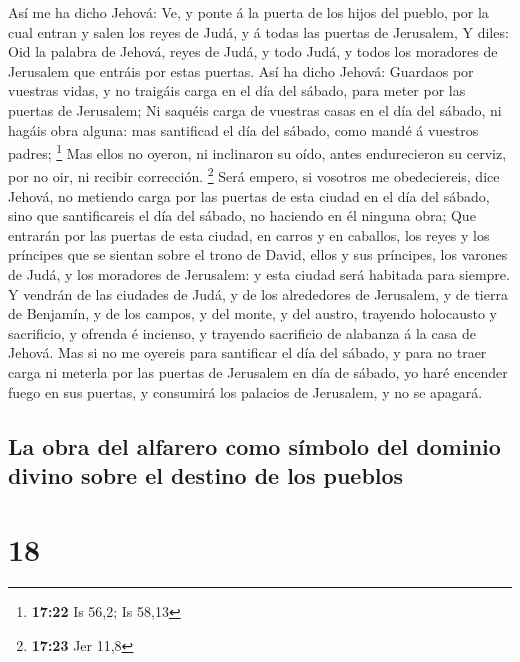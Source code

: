  Así me ha dicho Jehová: Ve, y ponte á la puerta de los
hijos del pueblo, por la cual entran y salen los reyes de Judá, y á
todas las puertas de Jerusalem,  Y diles: Oid la palabra de
Jehová, reyes de Judá, y todo Judá, y todos los moradores de Jerusalem
que entráis por estas puertas.  Así ha dicho Jehová:
Guardaos por vuestras vidas, y no traigáis carga en el día del sábado,
para meter por las puertas de Jerusalem;  Ni saquéis carga
de vuestras casas en el día del sábado, ni hagáis obra alguna: mas
santificad el día del sábado, como mandé á vuestros padres; \footnote{\textbf{17:22}
  Is 56,2; Is 58,13}  Mas ellos no oyeron, ni inclinaron su
oído, antes endurecieron su cerviz, por no oir, ni recibir corrección.
\footnote{\textbf{17:23} Jer 11,8}  Será empero, si
vosotros me obedeciereis, dice Jehová, no metiendo carga por las puertas
de esta ciudad en el día del sábado, sino que santificareis el día del
sábado, no haciendo en él ninguna obra;  Que entrarán por
las puertas de esta ciudad, en carros y en caballos, los reyes y los
príncipes que se sientan sobre el trono de David, ellos y sus príncipes,
los varones de Judá, y los moradores de Jerusalem: y esta ciudad será
habitada para siempre.  Y vendrán de las ciudades de Judá,
y de los alrededores de Jerusalem, y de tierra de Benjamín, y de los
campos, y del monte, y del austro, trayendo holocausto y sacrificio, y
ofrenda é incienso, y trayendo sacrificio de alabanza á la casa de
Jehová.  Mas si no me oyereis para santificar el día del
sábado, y para no traer carga ni meterla por las puertas de Jerusalem en
día de sábado, yo haré encender fuego en sus puertas, y consumirá los
palacios de Jerusalem, y no se apagará.

\hypertarget{la-obra-del-alfarero-como-suxedmbolo-del-dominio-divino-sobre-el-destino-de-los-pueblos}{%
\subsection{La obra del alfarero como símbolo del dominio divino sobre
el destino de los
pueblos}\label{la-obra-del-alfarero-como-suxedmbolo-del-dominio-divino-sobre-el-destino-de-los-pueblos}}

\hypertarget{section-17}{%
\section{18}\label{section-17}}

